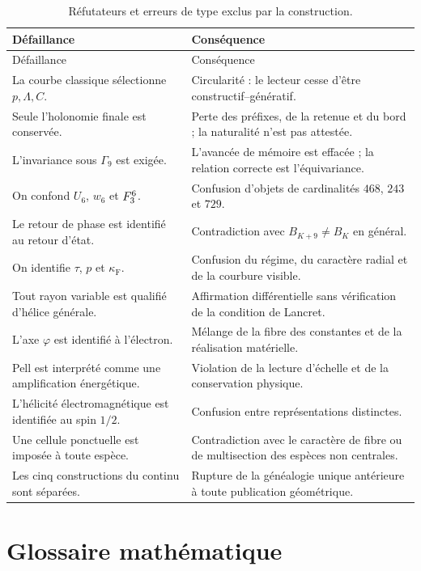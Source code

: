 \begin{longtable}{p{}p{}}
\caption{Réfutateurs et erreurs de type exclus par la construction.}
\label{espiral:tab:falsadores-ap}\\
\toprule
Défaillance&Conséquence\\
\midrule
\endfirsthead
\toprule
Défaillance&Conséquence\\
\midrule
\endhead
La courbe classique sélectionne \(p,\Lambda,C\).&Circularité : le lecteur cesse d'être constructif--génératif.\\
Seule l'holonomie finale est conservée.&Perte des préfixes, de la retenue et du bord ; la naturalité n'est pas attestée.\\
L'invariance sous \(\Gamma_9\) est exigée.&L'avancée de mémoire est effacée ; la relation correcte est l'équivariance.\\
On confond \(U_6\), \(w_6\) et \(F_3^6\).&Confusion d'objets de cardinalités \(468\), \(243\) et \(729\).\\
Le retour de phase est identifié au retour d'état.&Contradiction avec \(B_{K+9}\neq B_K\) en général.\\
On identifie \(\tau\), \(p\) et \(\kappa_{\mathrm{F}}\).&Confusion du régime, du caractère radial et de la courbure visible.\\
Tout rayon variable est qualifié d'hélice générale.&Affirmation différentielle sans vérification de la condition de Lancret.\\
L'axe \(\varphi\) est identifié à l'électron.&Mélange de la fibre des constantes et de la réalisation matérielle.\\
Pell est interprété comme une amplification énergétique.&Violation de la lecture d'échelle et de la conservation physique.\\
L'hélicité électromagnétique est identifiée au spin \(1/2\).&Confusion entre représentations distinctes.\\
Une cellule ponctuelle est imposée à toute espèce.&Contradiction avec le caractère de fibre ou de multisection des espèces non centrales.\\
Les cinq constructions du continu sont séparées.&Rupture de la généalogie unique antérieure à toute publication géométrique.\\
\bottomrule
\end{longtable}

\chapter{Glossaire mathématique}

